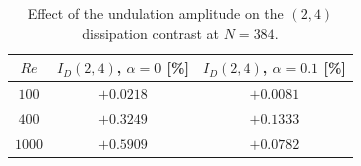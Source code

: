 \begin{table}[!htbp]
\centering
\caption{Effect of the undulation amplitude on the $(2,4)$ dissipation contrast at $N=384$.}
\label{supptab:amplitude}
\begin{tabular}{@{}ccc@{}}
\hline
$Re$ & $I_D(2,4)$, $\alpha=0$ [\%] & $I_D(2,4)$, $\alpha=0.1$ [\%] \\
\hline
$100$  & $+0.0218$ & $+0.0081$ \\
$400$  & $+0.3249$ & $+0.1333$ \\
$1000$ & $+0.5909$ & $+0.0782$ \\
\hline
\end{tabular}
\end{table}

\clearpage
